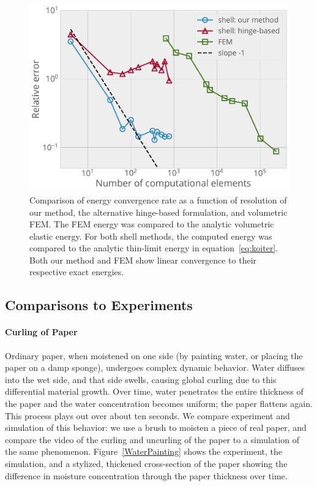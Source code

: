 \documentclass[timestamp,acmtog]{acmart}
\begin{document}
\begin{figure}[h]
  \centering
  \includegraphics[width=\columnwidth]{convergenceEnergy.pdf}
  \caption{ Comparison of energy convergence rate as a function of resolution of our method, the alternative hinge-based formulation, and volumetric FEM. The FEM energy was compared to the analytic volumetric elastic energy. For both shell methods, the computed energy was compared to the analytic thin-limit energy in equation~\eqref{eq:koiter}. Both our method and FEM show linear convergence to their respective exact energies.}
  \label{fig:Convergence}
\end{figure}

\subsection{Comparisons to Experiments}

\paragraph{Curling of Paper}
Ordinary paper, when moistened on one side (by painting water, or placing the paper on a damp sponge), undergoes complex dynamic behavior. Water diffuses into the wet side, and that side swells, causing global curling due to this differential material growth. Over time, water penetrates the entire thickness of the paper and the water concentration becomes uniform; the paper flattens again. This process plays out over about ten seconds. We compare experiment and simulation of this behavior: we use a brush to moisten a piece of real paper, and compare the video of the curling and uncurling of the paper to a simulation of the same phenomenon. Figure~\ref{WaterPainting} shows the experiment, the simulation, and a stylized, thickened cross-section of the paper showing the difference in moisture concentration through the paper thickness over time.
\end{document}
